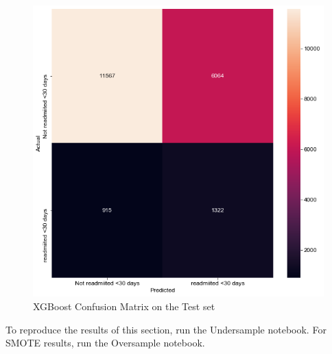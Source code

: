 \documentclass[letterpaper, 10 pt, conference]{ieeeconf}  %
\begin{document}
 \begin{figure}[!hbt]
\centering
\includegraphics[width=0.9\columnwidth]{cmbest.png}
\caption{XGBoost Confusion Matrix on the Test set}
\label{confusion}
\end{figure}
 To reproduce the results of this section, run the Undersample notebook. For SMOTE results, run the Oversample notebook.
\end{document}
